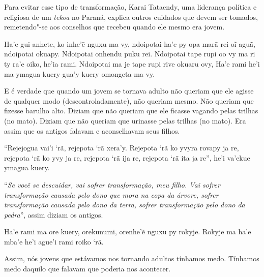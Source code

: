 Para evitar esse tipo de transformação, Karai Tataendy, uma liderança
política e religiosa de um \emph{tekoa} no Paraná, explica outros cuidados que
devem ser tomados, remetendo"-se aos conselhos que recebeu quando ele
mesmo era jovem. 

\clearpage

\begin{paracol}{2}
\footnotesize
\vspace*{0.26cm}

\noindent
Ha'e gui anhete, ko inhe'ẽ nguxu ma vy, ndoipotai ha'e py opa marã rei
oĩ aguã, ndoipotai okuapy. Ndoipotai onhendu puku rei. Ndoipotai tape
rupi oo vy ma ri ty ra'e oiko, he'ia rami. Ndoipotai ma je tape rupi
rive okuaru ovy, Ha'e rami he'i ma ymagua kuery gua'y kuery omongeta ma
vy.

\bigskip

\switchcolumn
\noindent
E é verdade que quando um jovem se tornava adulto não queriam que ele
agisse de qualquer modo (descontroladamente), não queriam mesmo. Não
queriam que fizesse barulho alto. Diziam que não queriam que ele
ficasse vagando pelas trilhas (no mato). Diziam que não queriam que
urinasse pelas trilhas (no mato). Era assim que os antigos falavam e
aconselhavam seus filhos. 

\vspace{2pt plus 1pt minus 1pt}

\switchcolumn
\medskip
\noindent
``Rejejogua vai’i ‘rã, rejepota ‘rã xera’y. Rejepota ‘rã ko yvyra rovapy
ja re, rejepota ‘rã ko yvy ja re, rejepota ‘rã ija re, rejepota ‘rã ita
ja re'', he’i va’ekue ymagua kuery. 

\bigskip

\switchcolumn
\noindent
``\emph{Se você se descuidar, vai sofrer transformação, meu filho. Vai
sofrer transformação causada pelo dono que mora na copa da árvore,
sofrer transformação causada pelo dono da terra, sofrer transformação
pelo dono da pedra}'', assim diziam os antigos.

\vspace{2pt plus 1pt minus 1pt}

\switchcolumn
\medskip
\noindent
Ha'e rami ma ore kuery, orekunumi, orenhe'ẽ nguxu py rokyje. Rokyje ma
ha'e mba'e he'i ague'i rami roiko `rã.

\bigskip

\switchcolumn
\noindent
Assim, nós jovens que estávamos nos tornando adultos tínhamos medo.
Tínhamos medo daquilo que falavam que poderia nos acontecer. 


\end{paracol}
